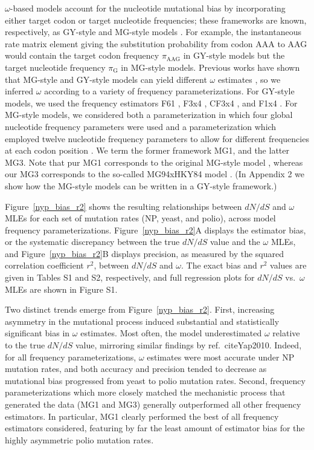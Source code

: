 \documentclass[11pt]{article}
\begin{document}
$\omega$-based models account for the nucleotide mutational bias by incorporating either target codon \cite{GoldmanYang1994} or target nucleotide \cite{MuseGaut1994} frequencies; these frameworks are known, respectively, as GY-style and MG-style models \cite{KosakovskyPond2010}. For example, the instantaneous rate matrix element giving the substitution probability from codon AAA to AAG would contain the target codon frequency $\pi_\text{AAG}$ in GY-style models but the target nucleotide frequency $\pi_\text{G}$ in MG-style models. Previous works have shown that MG-style and GY-style models can yield different $\omega$ estimates \cite{KosakovskyPondMuse2005,Yap2010}, so we inferred $\omega$ according to a variety of frequency parameterizations. For GY-style models, we used the frequency estimators F61 \cite{GoldmanYang1994}, F3x4 \cite{GoldmanYang1994}, CF3x4 \cite{KosakovskyPond2010}, and F1x4 \cite{MuseGaut1994}. For MG-style models, we considered both a parameterization in which four global nucleotide frequency parameters were used \cite{MuseGaut1994} and a parameterization which employed twelve nucleotide frequency parameters to allow for different frequencies at each codon position \cite{KosakovskyPondMuse2005}. We term the former framework MG1, and the latter MG3. Note that pur MG1 corresponds to the original MG-style model \cite{MuseGaut1994}, whereas our MG3 corresponds to the so-called MG94xHKY84 model \cite{KosakovskyPondMuse2005}. (In Appendix 2 we show how the MG-style models can be written in a GY-style framework.)

Figure~\ref{nyp_bias_r2} shows the resulting relationships between $dN/dS$ and $\omega$ MLEs for each set of mutation rates (NP, yeast, and polio), across model frequency parameterizations. Figure~\ref{nyp_bias_r2}A displays the estimator bias, or the systematic discrepancy between the true $dN/dS$ value and the $\omega$ MLEs, and Figure~\ref{nyp_bias_r2}B displays precision, as measured by the squared correlation coefficient $r^2$, between $dN/dS$ and $\omega$. The exact bias and $r^2$ values are given in Tables S1 and S2, respectively, and full regression plots for $dN/dS$ vs.\ $\omega$ MLEs are shown in Figure S1.

Two distinct trends emerge from Figure~\ref{nyp_bias_r2}. First, increasing asymmetry in the mutational process induced substantial and statistically significant bias in $\omega$ estimates. Most often, the model underestimated $\omega$ relative to the true $dN/dS$ value, mirroring similar findings by ref.\ cite{Yap2010}. Indeed, for all frequency parameterizations, $\omega$ estimates were most accurate under NP mutation rates, and both accuracy and precision tended to decrease as mutational bias progressed from yeast to polio mutation rates. Second, frequency parameterizations which more closely matched the mechanistic process that generated the data (MG1 and MG3) generally outperformed all other frequency estimators. In particular, MG1 clearly performed the best of all frequency estimators considered, featuring by far the least amount of estimator bias for the highly asymmetric polio mutation rates.
\end{document}
